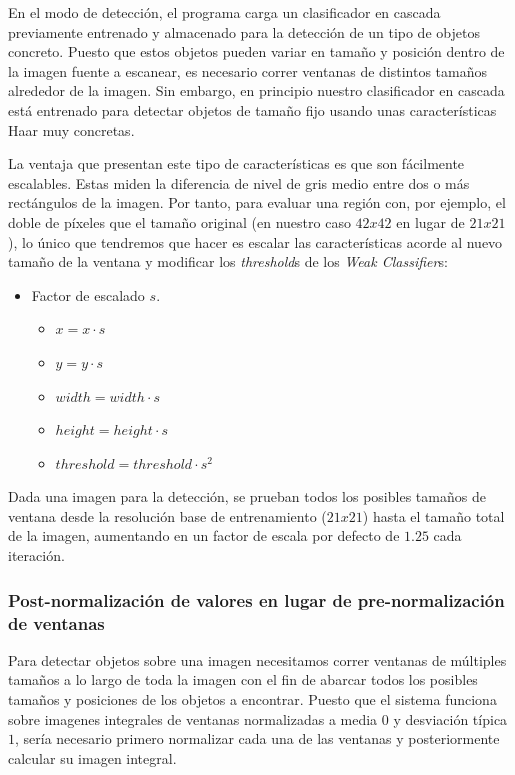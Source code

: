 \documentclass[11pt,spanish,a4paper]{article} %
\begin{document}
En el modo de detección, el programa carga un clasificador en cascada previamente entrenado y almacenado para la detección de un tipo de objetos concreto. Puesto que estos objetos pueden variar en tamaño y posición dentro de la imagen fuente a escanear, es necesario correr ventanas de distintos tamaños alrededor de la imagen. Sin embargo, en principio nuestro clasificador en cascada está entrenado para detectar objetos de tamaño fijo usando unas características Haar muy concretas.

La ventaja que presentan este tipo de características es que son fácilmente escalables. Estas miden la diferencia de nivel de gris medio entre dos o más rectángulos de la imagen. Por tanto, para evaluar una región con, por ejemplo, el doble de píxeles que el tamaño original (en nuestro caso $42x42$ en lugar de $21x21$), lo único que tendremos que hacer es escalar las características acorde al nuevo tamaño de la ventana y modificar los \textit{threshold}s de los \textit{Weak Classifier}s:

\begin{itemize}
\item Factor de escalado $s$.
\begin{itemize}
\item $x = x \cdot s$
\item $y = y \cdot s$
\item $width = width \cdot s$
\item $height = height \cdot s$
\item $threshold = threshold \cdot s^2$
\end{itemize}
\end{itemize}

Dada una imagen para la detección, se prueban todos los posibles tamaños de ventana desde la resolución base de entrenamiento ($21x21$) hasta el tamaño total de la imagen, aumentando en un factor de escala por defecto de $1.25$ cada iteración.

\subsubsection{Post-normalización de valores en lugar de pre-normalización de ventanas}

Para detectar objetos sobre una imagen necesitamos correr ventanas de múltiples tamaños a lo largo de toda la imagen con el fin de abarcar todos los posibles tamaños y posiciones de los objetos a encontrar. Puesto que el sistema funciona sobre imagenes integrales de ventanas normalizadas a media $0$ y desviación típica $1$, sería necesario primero normalizar cada una de las ventanas y posteriormente calcular su imagen integral.
\end{document}
